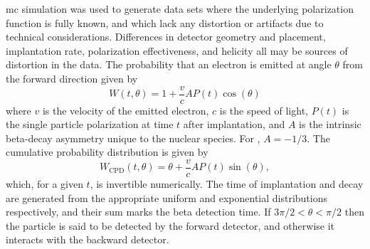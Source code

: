 \Gls{mc} simulation was used to generate data sets where the underlying polarization function is fully known, and which lack any distortion or artifacts due to technical considerations. Differences in detector geometry and placement, implantation rate, polarization effectiveness, and helicity all may be sources of distortion in the data. The probability that an electron is emitted at angle $\theta$ from the forward direction given by\cite{Correll1983}
%
\begin{equation}
W(t,\theta) = 1 + \frac{v}{c}AP(t)\cos(\theta)
\end{equation}
%
where $v$ is the velocity of the emitted electron, $c$ is the speed of light, $P(t)$ is the single particle polarization at time $t$ after implantation, and $A$ is the intrinsic beta-decay asymmetry unique to the nuclear species. For , $A = -1/3$\cite{Arnold1988}. The cumulative probability distribution is given by 
%
\begin{equation}
W_\mathrm{CPD}(t,\theta) = \theta + \frac{v}{c}AP(t)\sin(\theta),
\end{equation}
%
which, for a given $t$, is invertible numerically. The time of implantation and decay are generated from the appropriate uniform and exponential distributions respectively, and their sum marks the beta detection time. If $3\pi/2<\theta<\pi/2$ then the particle is said to be detected by the forward detector, and otherwise it interacts with the backward detector. 